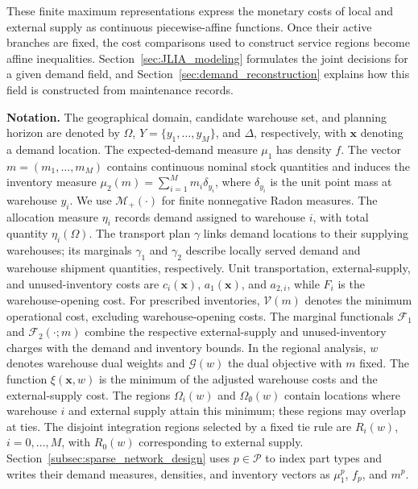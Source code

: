 \documentclass[a4paper,fleqn]{cas-sc}
\theoremstyle{remark}
\theoremstyle{plain}
\begin{document}
These finite maximum representations express the monetary costs of local and external supply as continuous piecewise-affine functions. Once their active branches are fixed, the cost comparisons used to construct service regions become affine inequalities. Section~\ref{sec:JLIA_modeling} formulates the joint decisions for a given demand field, and Section~\ref{sec:demand_reconstruction} explains how this field is constructed from maintenance records.

\par\noindent\textbf{Notation.}
The geographical domain, candidate warehouse set, and planning horizon are denoted by $\Omega$, $Y=\{y_1,\ldots,y_M\}$, and $\Delta$, respectively, with $\bm x$ denoting a demand location. The expected-demand measure $\mu_1$ has density $f$. The vector $m=(m_1,\ldots,m_M)$ contains continuous nominal stock quantities and induces the inventory measure $\mu_2(m)=\sum_{i=1}^M m_i\delta_{y_i}$, where $\delta_{y_i}$ is the unit point mass at warehouse $y_i$. We use $\mathcal M_+(\cdot)$ for finite nonnegative Radon measures. The allocation measure $\eta_i$ records demand assigned to warehouse $i$, with total quantity $\eta_i(\Omega)$. The transport plan $\gamma$ links demand locations to their supplying warehouses; its marginals $\gamma_1$ and $\gamma_2$ describe locally served demand and warehouse shipment quantities, respectively. Unit transportation, external-supply, and unused-inventory costs are $c_i(\bm x)$, $a_1(\bm x)$, and $a_{2,i}$, while $F_i$ is the warehouse-opening cost. For prescribed inventories, $\mathcal V(m)$ denotes the minimum operational cost, excluding warehouse-opening costs. The marginal functionals $\mathcal F_1$ and $\mathcal F_2(\cdot;m)$ combine the respective external-supply and unused-inventory charges with the demand and inventory bounds. In the regional analysis, $w$ denotes warehouse dual weights and $\mathcal G(w)$ the dual objective with $m$ fixed. The function $\xi(\bm x,w)$ is the minimum of the adjusted warehouse costs and the external-supply cost. The regions $\Omega_i(w)$ and $\Omega_\emptyset(w)$ contain locations where warehouse $i$ and external supply attain this minimum; these regions may overlap at ties. The disjoint integration regions selected by a fixed tie rule are $R_i(w)$, $i=0,\ldots,M$, with $R_0(w)$ corresponding to external supply. Section~\ref{subsec:sparse_network_design} uses $p\in\mathcal P$ to index part types and writes their demand measures, densities, and inventory vectors as $\mu_1^p$, $f_p$, and $m^p$.
\end{document}
